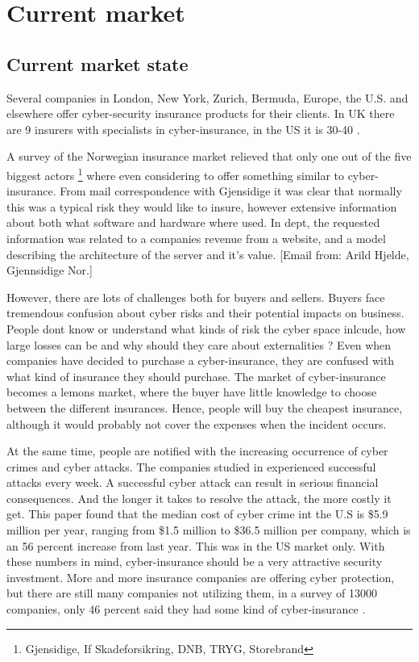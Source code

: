 \chapter{Current market}
\label{chp:hvahardenneaasi??} 
\section{Current market state}
Several companies in London, New York, Zurich, Bermuda, Europe, the U.S. and 
elsewhere offer cyber-security insurance products for their clients.
In UK there are 9 insurers with specialists in cyber-insurance, 
in the US it is 30-40 \cite{evolvingcyber}.


A survey of the Norwegian insurance market relieved that only one out of the five biggest actors \footnote{Gjensidige, If Skadeforsikring, DNB, TRYG, Storebrand} where even considering to offer something similar to cyber-insurance. From mail correspondence with Gjensidige it was clear that normally this was a typical risk they would like to insure, however extensive information about both what software and hardware where used. In dept, the requested information was related to a companies revenue from a website, and a model describing the architecture of the server and it's value. 
[Email from: Arild Hjelde, Gjennsidige Nor.]


However, there are lots of challenges both for buyers and sellers. 
Buyers face tremendous confusion about cyber risks and their potential impacts on business. 
People dont know or understand what kinds of risk the cyber space inlcude, 
how large losses can be and why should they care about externalities \cite{Cyberworkshop}?
Even when companies have decided to purchase a cyber-insurance, they are confused with what kind of insurance they should purchase.
The market of cyber-insurance becomes a lemons market, where the buyer have little knowledge to choose between the different insurances. 
Hence, people will buy the cheapest insurance, although it would probably not cover the expenses when the incident occurs. 

At the same time, people are notified with the increasing occurrence of cyber crimes and cyber attacks.
The companies studied in \cite{ccost} experienced successful attacks every week.
 A successful cyber attack can result in serious financial consequences. 
 And the longer it takes to resolve the attack, the more costly it get. 
 This paper found that the median cost of cyber crime int the U.S is \$5.9 million per year, 
 ranging from \$1.5 million to \$36.5 million per company, 
 which is an 56 percent increase from last year. This was in the US market only. 
 With these numbers in mind, cyber-insurance should be a very attractive security investment. 
 More and more insurance companies are offering cyber protection,
  but there are still many companies not utilizing them, in a survey of 13000 companies, 
  only 46 percent said they had some kind of cyber-insurance \cite{compworld}. 

